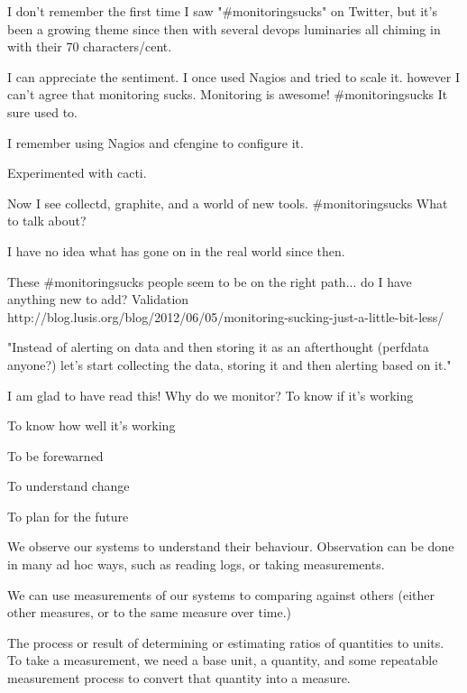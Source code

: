 \documentclass[online,12pt,helvetica]{chaksem}
\begin{document}
\begin{slide}

\end{slide}




I don't remember the first time I saw "{\#}monitoringsucks" on Twitter, but it's
been a growing theme since then with several devops luminaries all chiming in
with their 70 characters/cent.

I can appreciate the sentiment.  I once used Nagios and tried to scale it.
however I can't agree that monitoring sucks.   Monitoring is awesome!
{\#}monitoringsucks
It sure used to.

I remember using Nagios and cfengine to configure it.

Experimented with cacti.

Now I see collectd, graphite, and a world of new tools.
{\#}monitoringsucks
What to talk about?

I have no idea what has gone on in the real world since then.

These {\#}monitoringsucks people seem to be on the right path... do I have anything new to add?
Validation
http://blog.lusis.org/blog/2012/06/05/monitoring-sucking-just-a-little-bit-less/

"Instead of alerting on data and then storing it as an afterthought (perfdata anyone?) let’s start collecting the
data, storing it and then alerting based on it."


I am glad to have read this!
Why do we monitor?
To know if it's working

To know how well it's working

To be forewarned

To understand change

To plan for the future

We observe our systems to understand their behaviour.  Observation can be done
in many ad hoc ways, such as reading logs, or taking measurements.

We can use measurements of our systems to comparing against others (either other measures, or to the same measure over time.)

The process or result of determining or estimating ratios of quantities to
units.  To take a measurement, we need a base unit, a quantity, and some
repeatable measurement process to convert that quantity into a measure.
\end{document}
